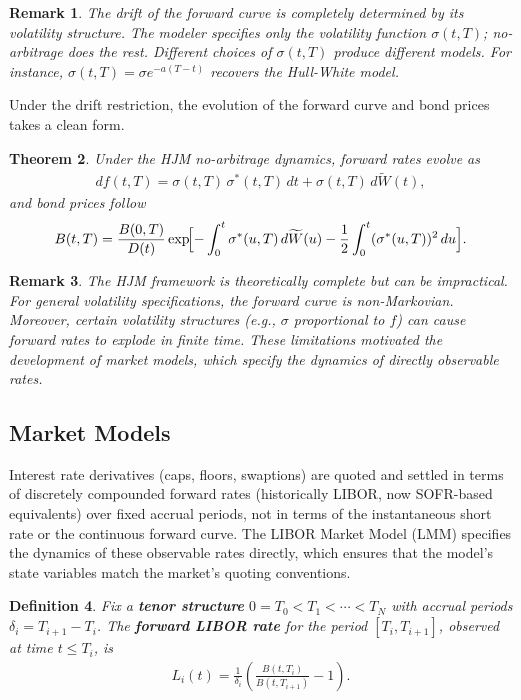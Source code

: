 \documentclass{report}
\theoremstyle{spacedplain}
\newtheorem{theorem}{Theorem}[section]
\theoremstyle{spaceddefinition}
\newtheorem{definition}[theorem]{Definition}
\theoremstyle{spacedremark}
\newtheorem{remark}[theorem]{Remark}
\begin{document}
\begin{remark}
The drift of the forward curve is completely determined by its volatility structure. The modeler specifies only the volatility function $\sigma(t,T)$; no-arbitrage does the rest. Different choices of $\sigma(t,T)$ produce different models. For instance, $\sigma(t,T) = \sigma e^{-a(T-t)}$ recovers the Hull-White model.
\end{remark}

Under the drift restriction, the evolution of the forward curve and bond prices takes a clean form.

\begin{theorem}
Under the HJM no-arbitrage dynamics, forward rates evolve as
\begin{align}
    df(t,T) = \sigma(t,T)\,\sigma^*(t,T)\,dt + \sigma(t,T)\,d\widetilde{W}(t),
\end{align}
and bond prices follow
\begin{align}
    B(t,T) = \frac{B(0,T)}{D(t)}\exp\!\Bigl[-\int_0^t \sigma^*(u,T)\,d\widetilde{W}(u) - \frac{1}{2}\int_0^t (\sigma^*(u,T))^2\,du\Bigr].
\end{align}
\end{theorem}

\begin{remark}
The HJM framework is theoretically complete but can be impractical. For general volatility specifications, the forward curve is non-Markovian. Moreover, certain volatility structures (e.g., $\sigma$ proportional to $f$) can cause forward rates to explode in finite time. These limitations motivated the development of market models, which specify the dynamics of directly observable rates.
\end{remark}


\subsection{Market Models}

Interest rate derivatives (caps, floors, swaptions) are quoted and settled in terms of discretely compounded forward rates (historically LIBOR, now SOFR-based equivalents) over fixed accrual periods, not in terms of the instantaneous short rate or the continuous forward curve. The LIBOR Market Model (LMM) specifies the dynamics of these observable rates directly, which ensures that the model's state variables match the market's quoting conventions.


\begin{definition}
Fix a \textbf{tenor structure} $0 = T_0 < T_1 < \cdots < T_N$ with accrual periods $\delta_i = T_{i+1} - T_i$. The \textbf{forward LIBOR rate} for the period $[T_i, T_{i+1}]$, observed at time $t \leq T_i$, is
\begin{align}
    L_i(t) = \frac{1}{\delta_i}\!\left(\frac{B(t,T_i)}{B(t,T_{i+1})} - 1\right).
\end{align}
\end{definition}
\end{document}
